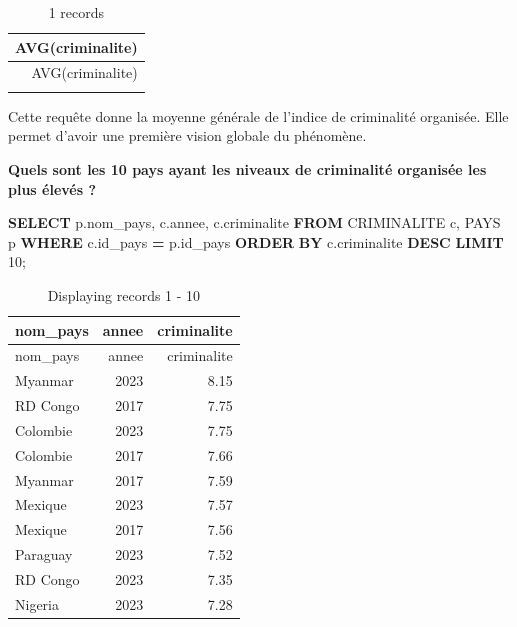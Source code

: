 \documentclass[mstat,12pt]{unswthesis}
\newenvironment{Shaded}{\begin{snugshade}}{\end{snugshade}}
\newcommand{\DecValTok}[1]{\textcolor[rgb]{0.00,0.00,0.81}{#1}}
\newcommand{\KeywordTok}[1]{\textcolor[rgb]{0.13,0.29,0.53}{\textbf{#1}}}
\newcommand{\NormalTok}[1]{#1}
\newcommand{\OperatorTok}[1]{\textcolor[rgb]{0.81,0.36,0.00}{\textbf{#1}}}
\begin{document}
\begin{longtable}[]{@{}r@{}}
\caption{1 records}\tabularnewline
\toprule\noalign{}
AVG(criminalite) \\
\midrule\noalign{}
\endfirsthead
\toprule\noalign{}
AVG(criminalite) \\
\midrule\noalign{}
\endhead
\bottomrule\noalign{}
\endlastfoot
5.255 \\
\end{longtable}

Cette requête donne la moyenne générale de l'indice de criminalité
organisée. Elle permet d'avoir une première vision globale du phénomène.

\newpage

\textbf{Quels sont les 10 pays ayant les niveaux de criminalité
organisée les plus élevés ?}

\begin{Shaded}
\begin{Highlighting}[]
\KeywordTok{SELECT}\NormalTok{ p.nom\_pays, c.annee, c.criminalite}
\KeywordTok{FROM}\NormalTok{ CRIMINALITE c, PAYS p}
\KeywordTok{WHERE}\NormalTok{ c.id\_pays }\OperatorTok{=}\NormalTok{ p.id\_pays}
\KeywordTok{ORDER} \KeywordTok{BY}\NormalTok{ c.criminalite }\KeywordTok{DESC}
\KeywordTok{LIMIT} \DecValTok{10}\NormalTok{;}
\end{Highlighting}
\end{Shaded}

\begin{longtable}[]{@{}lrr@{}}
\caption{Displaying records 1 - 10}\tabularnewline
\toprule\noalign{}
nom\_pays & annee & criminalite \\
\midrule\noalign{}
\endfirsthead
\toprule\noalign{}
nom\_pays & annee & criminalite \\
\midrule\noalign{}
\endhead
\bottomrule\noalign{}
\endlastfoot
Myanmar & 2023 & 8.15 \\
RD Congo & 2017 & 7.75 \\
Colombie & 2023 & 7.75 \\
Colombie & 2017 & 7.66 \\
Myanmar & 2017 & 7.59 \\
Mexique & 2023 & 7.57 \\
Mexique & 2017 & 7.56 \\
Paraguay & 2023 & 7.52 \\
RD Congo & 2023 & 7.35 \\
Nigeria & 2023 & 7.28 \\
\end{longtable}
\end{document}
